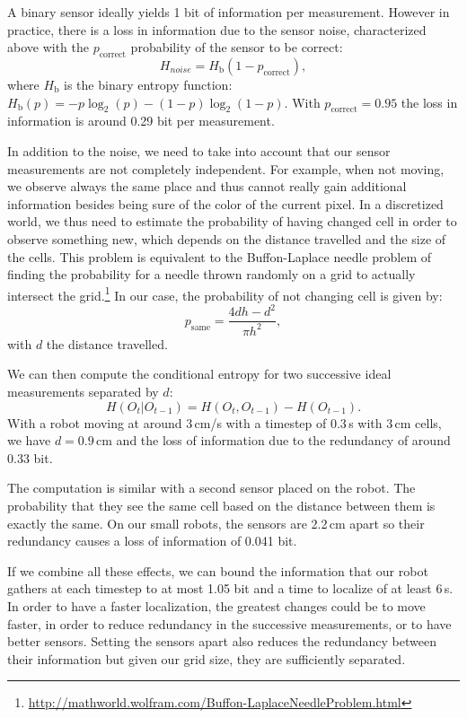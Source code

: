 \documentclass[letterpaper, 10pt, conference]{ieeeconf}
\begin{document}
A binary sensor ideally yields 1 bit of information per measurement.
However in practice, there is a loss in information due to the sensor noise, characterized above with the $p_{\mbox{correct}}$ probability of the sensor to be correct:
\begin{displaymath}
	H_{noise} = H_{\mbox{b}}(1 - p_{\mbox{correct}}),
\end{displaymath}
where $H_{\mbox{b}}$ is the binary entropy function: $H_{\mbox{b}}(p) = -p\log_2(p) - (1-p)\log_2(1-p)$.
With $p_{\mbox{correct}}=0.95$ the loss in information is around 0.29 bit per measurement.

In addition to the noise, we need to take into account that our sensor measurements are not completely independent.
For example, when not moving, we observe always the same place and thus cannot really gain additional information besides being sure of the color of the current pixel.
In a discretized world, we thus need to estimate the probability of having changed cell in order to observe something new, which depends on the distance travelled and the size of the cells.
This problem is equivalent to the Buffon-Laplace needle problem of finding the probability for a needle thrown randomly on a grid to actually intersect the grid.\footnote{\url{http://mathworld.wolfram.com/Buffon-LaplaceNeedleProblem.html}}
In our case, the probability of not changing cell is given by:
\begin{displaymath}
	p_{\mbox{same}} = \frac{4d h - d^2}{\pi h^2},
\end{displaymath}
with $d$ the distance travelled.

We can then compute the conditional entropy for two successive ideal measurements separated by $d$:
\begin{displaymath}
	H(O_t | O_{t-1}) = H(O_t, O_{t-1}) - H(O_{t-1}).
\end{displaymath}
With a robot moving at around 3\,cm/s with a timestep of 0.3\,s with 3\,cm cells, we have $d=0.9$\,cm and the loss of information due to the redundancy of around 0.33 bit.

The computation is similar with a second sensor placed on the robot.
The probability that they see the same cell based on the distance between them is exactly the same.
On our small robots, the sensors are 2.2\,cm apart so their redundancy causes a loss of information of 0.041 bit.

If we combine all these effects, we can bound the information that our robot gathers at each timestep to at most 1.05 bit and a time to localize of at least 6\,s.
In order to have a faster localization, the greatest changes could be to move faster, in order to reduce redundancy in the successive measurements, or to have better sensors.
Setting the sensors apart also reduces the redundancy between their information but given our grid size, they are sufficiently separated.
\end{document}
